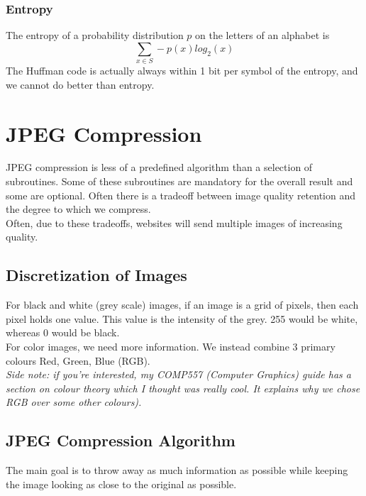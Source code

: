 \documentclass[12pt]{article}
\theoremstyle{definition}
\begin{document}
\subsubsection{Entropy}
The entropy of a probability distribution $p$ on the letters of an alphabet is 
$$\sum_{x \in S}-p(x)log_2(x)$$
The Huffman code is actually always within 1 bit per symbol of the entropy, and we cannot do better than entropy. 

\section{JPEG Compression}
JPEG compression is less of a predefined algorithm than a selection of subroutines. Some of these subroutines are mandatory for the overall result and some are optional. Often there is a tradeoff between image quality retention and the degree to which we compress. 
\\ \linebreak
 Often, due to these tradeoffs, websites will send multiple images of increasing quality. 
\subsection{Discretization of Images}
For black and white (grey scale) images, if an image is a grid of pixels, then each pixel holds one value. This value is the intensity of the grey. 255 would be white, whereas 0 would be black. 
\\ \linebreak
For color images, we need more information. We instead combine 3 primary colours Red, Green, Blue (RGB). 
\\ \linebreak
\textit{Side note: if you're interested, my COMP557 (Computer Graphics) guide has a section on colour theory which I thought was really cool. It explains why we chose RGB over some other colours).}
\\ \linebreak

\subsection{JPEG Compression Algorithm}
The main goal is to throw away as much information as possible while keeping the image looking as close to the original as possible.
\\ \linebreak
\end{document}
